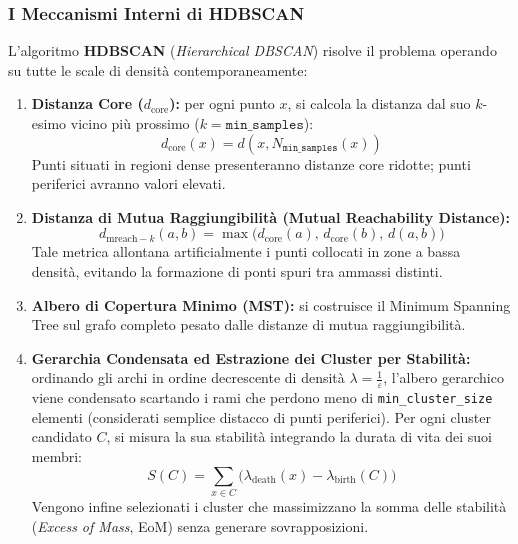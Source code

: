 \FloatBarrier
\subsubsection{I Meccanismi Interni di HDBSCAN}
\label{subsec:lab-hdbscan-internals}

L'algoritmo \textbf{HDBSCAN} (\textit{Hierarchical DBSCAN}) \cite{campello2015} risolve il problema operando su tutte le scale di densità contemporaneamente:
\begin{enumerate}
    \item \textbf{Distanza Core ($d_{\text{core}}$):} per ogni punto $x$, si calcola la distanza dal suo $k$-esimo vicino più prossimo ($k = \texttt{min\_samples}$):
    \begin{equation}
        d_{\text{core}}(x) = d(x, N_{\texttt{min\_samples}}(x))
    \end{equation}
    Punti situati in regioni dense presenteranno distanze core ridotte; punti periferici avranno valori elevati.
    \item \textbf{Distanza di Mutua Raggiungibilità (Mutual Reachability Distance):}
    \begin{equation}
        d_{\text{mreach}-k}(a, b) = \max\big( d_{\text{core}}(a),\, d_{\text{core}}(b),\, d(a, b) \big)
    \end{equation}
    Tale metrica allontana artificialmente i punti collocati in zone a bassa densità, evitando la formazione di ponti spuri tra ammassi distinti.
    \item \textbf{Albero di Copertura Minimo (MST):} si costruisce il Minimum Spanning Tree sul grafo completo pesato dalle distanze di mutua raggiungibilità.
    \item \textbf{Gerarchia Condensata ed Estrazione dei Cluster per Stabilità:} ordinando gli archi in ordine decrescente di densità $\lambda = \frac{1}{\varepsilon}$, l'albero gerarchico viene condensato scartando i rami che perdono meno di \texttt{min\_cluster\_size} elementi (considerati semplice distacco di punti periferici). Per ogni cluster candidato $C$, si misura la sua stabilità integrando la durata di vita dei suoi membri:
    \begin{equation}
        S(C) = \sum_{x \in C} \big( \lambda_{\text{death}}(x) - \lambda_{\text{birth}}(C) \big)
    \end{equation}
    Vengono infine selezionati i cluster che massimizzano la somma delle stabilità (\textit{Excess of Mass}, EoM) senza generare sovrapposizioni.
\end{enumerate}


